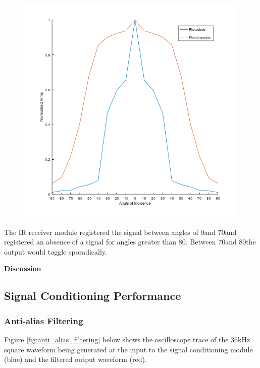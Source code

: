 \begin{figure}[H]
\begin{minipage}{.4\linewidth}
		\includegraphics[width=\textwidth]{figures/results/beam_pattern_square.png}
		\label{fig:beam_pattern}
	\end{minipage}
\end{figure}

The IR receiver module registered the signal between angles of 0\textdegree and 70\textdegree and registered an absence of a signal for angles greater than 80\textdegree. Between 70\textdegree and 80\textdegree the output would toggle sporadically.


\textbf{Discussion}\\








\subsection{Signal Conditioning Performance}

\subsubsection{Anti-alias Filtering}
Figure \ref{fig:anti_alias_filtering} below shows the oscilloscope trace of the 36kHz square waveform being generated at the input to the signal conditioning module (blue) and the filtered output waveform (red).

